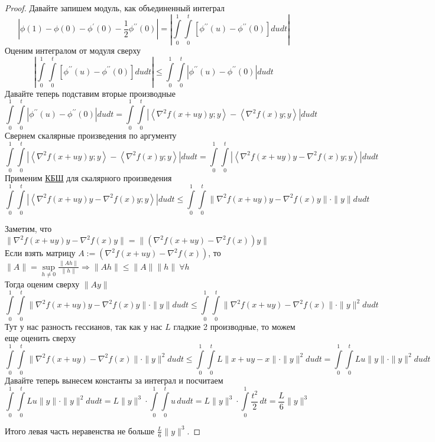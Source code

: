 \begin{proof}
  Давайте запишем модуль, как объединенный интеграл
  \[
  \left| \phi(1) - \phi(0) - \phi^{\prime}(0) - \frac{1}{2} \phi^{\prime\prime} (0) \right| = \left| \int\limits_0^1 \int\limits_0^t \left[ \phi^{\prime\prime}(u)-\phi^{\prime\prime}(0) \right]du dt  \right|
  \]
  Оценим интегралом от модуля сверху
  \[
  \left| \int\limits_0^1 \int\limits_0^t \left[ \phi^{\prime\prime}(u)-\phi^{\prime\prime}(0) \right]du dt  \right| \le
   \int\limits_0^1 \int\limits_0^t \left| \phi^{\prime\prime}(u)-\phi^{\prime\prime}(0) \right|du dt
  \]
  Давайте теперь подставим вторые производные
  \[
  \int\limits_0^1 \int\limits_0^t \left| \phi^{\prime\prime}(u)-\phi^{\prime\prime}(0) \right|du dt =
   \int\limits_0^1 \int\limits_0^t \left| \left\langle \nabla^2 f(x + uy)y; y  \right\rangle - \left\langle \nabla^2f(x)y;  y \right\rangle \right|du dt
  \]
  Свернем скалярные произведения по аргументу
  \[
   \int\limits_0^1 \int\limits_0^t \left| \left\langle \nabla^2 f(x + uy)y; y  \right\rangle - \left\langle \nabla^2f(x)y;  y \right\rangle \right|du dt  =
   \int\limits_0^1 \int\limits_0^t \left| \left\langle \nabla^2 f(x + uy)y - \nabla^2 f(x) y; y  \right\rangle \right|du dt
  \]
  Применим \hyperref[note:D0601ACD-8C91-4A93-B0E4-AC0D529C6A5C]{КБШ} для скалярного произведения
  \[
   \int\limits_0^1 \int\limits_0^t \left| \left\langle \nabla^2 f(x + uy)y - \nabla^2 f(x) y; y  \right\rangle \right|du dt \le
   \int\limits_0^1 \int\limits_0^t \| \nabla^2 f(x + uy)y - \nabla^2f(x)y\| \cdot \| y\| du dt
  \]

  Заметим, что $\| \nabla^2 f(x + uy)y - \nabla^2f(x)y\| = \| (\nabla^2 f(x + uy) - \nabla^2f(x)) y\|$ \\
  Если взять матрицу $A:= (\nabla^2 f(x + uy) - \nabla^2f(x))$, то
  $\| A \| = \sup\limits_{h \ne 0} \frac{\| A h \|}{\| h\|} \Rightarrow \|Ah \| \le \|A\| \|h\|\ \forall h$ \\
  Тогда оценим сверху $\|Ay\|$
  \[
   \int\limits_0^1 \int\limits_0^t \| \nabla^2 f(x + uy)y - \nabla^2f(x)y\| \cdot \| y\| du dt  \le
   \int\limits_0^1 \int\limits_0^t \| \nabla^2 f(x + uy) - \nabla^2f(x)\| \cdot \| y\|^2 du dt
  \]
  Тут у нас разность гессианов, так как у нас $L$ гладкие 2 производные, то можем еще оценить сверху
  \[
   \int\limits_0^1 \int\limits_0^t \| \nabla^2 f(x + uy) - \nabla^2f(x)\| \cdot \| y\|^2 du dt
   \le
   \int\limits_0^1 \int\limits_0^t L \| x + uy - x \| \cdot \| y\|^2 du dt =
   \int\limits_0^1 \int\limits_0^t L u \| y \| \cdot \| y\|^2 du dt
  \]
  Давайте теперь вынесем константы за интеграл и посчитаем
  \[
   \int\limits_0^1 \int\limits_0^t L u \| y \| \cdot \| y\|^2 du dt =
   L \|y\|^3  \cdot \int\limits_0^1 \int\limits_0^t u\, du dt = L \|y\|^3 \cdot \int\limits_0^1 \frac{t^2}{2}\,dt
   = \frac{L}{6} \| y \|^3
  \]

  Итого левая часть неравенства не больше $\frac{L}{6} \| y \|^3$.
\end{proof}
